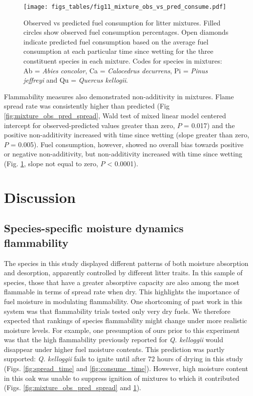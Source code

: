 \documentclass[letterpaper,12pt]{article}
\begin{document}
\begin{figure}[h]
  \centering
\texttt{[image: figs\_tables/fig11\_mixture\_obs\_vs\_pred\_consume.pdf]}
\caption{Observed vs predicted fuel consumption for litter mixtures. Filled
  circles show observed fuel consumption percentages. Open diamonds indicate
  predicted fuel consumption based on the average fuel consumption at each
  particular time since wetting for the three constituent species in each
  mixture. Codes for species in mixtures: Ab = \emph{Abies concolor}, Ca =
  \emph{Calocedrus decurrens}, Pi = \emph{Pinus jeffreyi} and Qu =
  \emph{Quercus kellogii}.}
  \label{fig:mixture_obs_pred_consume}
\end{figure}


Flammability measures also demonstrated non-additivity in mixtures. Flame
spread rate was consistently higher than predicted (Fig
\ref{fig:mixture_obs_pred_spread}, Wald test of mixed linear model centered
intercept for observed-predicted values greater than zero, $P$ = 0.017) and the
positive non-additivity increased with time since wetting (slope greater than
zero, $P$ = 0.005). Fuel consumption, however, showed no overall bias towards
positive or negative non-additivity, but non-additivity increased with time
since wetting (Fig. \ref{fig:mixture_obs_pred_consume}, slope not equal to
zero, $P$ < 0.0001).

\section*{Discussion}

\subsection*{Species-specific moisture dynamics flammability}

The species in this study displayed different patterns of both moisture
absorption and desorption, apparently controlled by different litter traits. In
this sample of species, those that have a greater absorptive capacity are also
among the most flammable in terms of spread rate when dry. This highlights the
importance of fuel moisture in modulating flammability. One shortcoming of past
work in this system \citep{Magalhaes+Schwilk-2012} was that flammability trials
tested only very dry fuels. We therefore expected that rankings of species
flammability might change under more realistic moisture levels. For example,
one presumption of ours prior to this experiment was that the high flammability
previously reported for \emph{Q. kelloggii} \citep{Magalhaes+Schwilk-2012} would
disappear under higher fuel moisture contents. This prediction was partly
supported: \emph{Q. kelloggii} fails to ignite until after 72 hours of drying
in this study (Figs. \ref{fig:spread_time} and \ref{fig:consume_time}).
However, high moisture content in this oak was unable to suppress ignition of
mixtures to which it contributed (Figs. \ref{fig:mixture_obs_pred_spread} and
\ref{fig:mixture_obs_pred_consume}).
\end{document}
